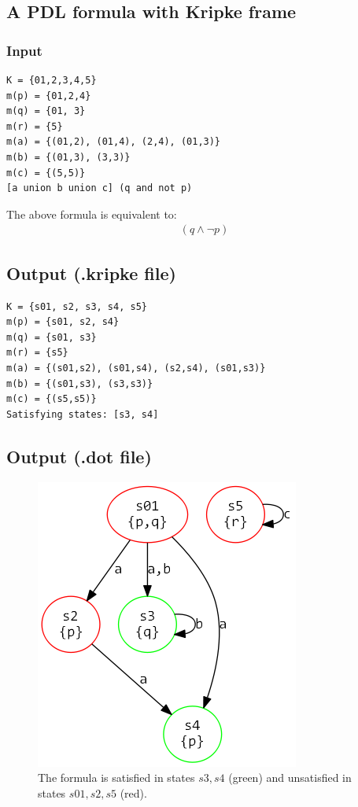 \documentclass[12pt,a4paper]{article}
\begin{document}
\subsection{A PDL formula with Kripke frame}

\subsubsection*{Input}
\begin{verbatim}
K = {01,2,3,4,5}
m(p) = {01,2,4}
m(q) = {01, 3}
m(r) = {5}
m(a) = {(01,2), (01,4), (2,4), (01,3)}
m(b) = {(01,3), (3,3)}
m(c) = {(5,5)}
[a union b union c] (q and not p)
\end{verbatim}
The above formula is equivalent to:
\begin{align*}
[((a \cup b) \cup c)](q \wedge \neg p)
\end{align*}
\subsection*{Output (.kripke file)}
\begin{verbatim}
K = {s01, s2, s3, s4, s5}
m(p) = {s01, s2, s4}
m(q) = {s01, s3}
m(r) = {s5}
m(a) = {(s01,s2), (s01,s4), (s2,s4), (s01,s3)}
m(b) = {(s01,s3), (s3,s3)}
m(c) = {(s5,s5)}
Satisfying states: [s3, s4]
\end{verbatim}
\subsection*{Output (.dot file)}

\begin{figure}[H]
\center
\includegraphics[scale=0.4]{example2.png}

\caption{The formula is satisfied in states $s3, s4$ (green) and unsatisfied in states $s01, s2, s5$ (red). }
\end{figure}






\end{document}
